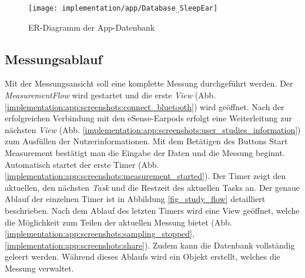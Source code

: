 \begin{figure}[ht]
  \centering
  \texttt{[image: implementation/app/Database\_SleepEar]}
  \caption{ER-Diagramm der App-Datenbank}
  \label{implementation:app:erModel}
\end{figure}

\newpage
\subsection{Messungsablauf}
\label{ch:Implementierung:app:measurement_procedure}
Mit der Messungsansicht soll eine komplette Messung durchgeführt werden.
Der \textit{MeasurementFlow} wird gestartet und die erste \textit{View} (Abb. \ref{implementation:app:screenshots:connect_bluetooth}) wird geöffnet.
Nach der erfolgreichen Verbindung mit den eSense-Earpods erfolgt eine Weiterleitung zur nächsten \textit{View} (Abb. \ref{implementation:app:screenshots:user_studies_information}) zum Ausfüllen der Nutzerinformationen. 
Mit dem Betätigen des Buttons {\glqq Start Measurement\grqq} bestätigt man die Eingabe der Daten und die Messung beginnt.
Automatisch startet der erste Timer (Abb. \ref{implementation:app:screenshots:measurement_started}).
Der Timer zeigt den aktuellen, den nächsten \textit{Task} und die Restzeit des aktuellen Tasks an.
Der genaue Ablauf der einzelnen Timer ist in Abbildung \ref{fig_study_flow} detailliert beschrieben.
Nach dem Ablauf des letzten Timers wird eine View geöffnet, welche die Möglichkeit zum Teilen der aktuellen Messung bietet (Abb. \ref{implementation:app:screenshots:sampling_stopped}, \ref{implementation:app:screenshots:share}).
Zudem kann die Datenbank vollständig geleert werden.
Während dieses Ablaufs wird ein Objekt erstellt, welches die Messung verwaltet.


